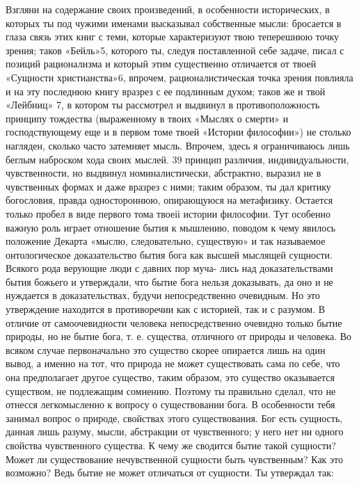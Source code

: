 \documentclass[12pt]{article}
\begin{document}
Взгляни на содержание своих произведений, в  
особенности исторических, в которых ты под чужими 
именами высказывал собственные мысли: бросается в 
глаза связь этих книг с теми, которые характеризуют 
твою теперешнюю точку зрения; таков «Бейль»5,  
которого ты, следуя поставленной себе задаче, писал с позиций рационализма и который этим существенно  
отличается от твоей «Сущности христианства»6, впрочем, рационалистическая точка зрения повлияла и на эту 
последнюю книгу вразрез с ее подлинным духом; таков 
же и твой «Лейбниц» 7, в котором ты рассмотрел и  
выдвинул в противоположность принципу тождества  
(выраженному в твоих «Мыслях о смерти» и  
господствующему еще и в первом томе твоей «Истории философии») 
не столько нагляден, сколько часто затемняет мысль.  
Впрочем, здесь я ограничиваюсь лишь беглым наброском хода 
своих мыслей. 
39 
принцип различия, индивидуальности, чувственности, 
но выдвинул номиналистически, абстрактно, выразил 
не в чувственных формах и даже вразрез с ними;  
таким образом, ты дал критику богословия, правда  
одностороннюю, опирающуюся на метафизику. Остается 
только пробел в виде первого тома твоеіі истории  
философии. Тут особенно важную роль играет отношение 
бытия к мышлению, поводом к чему явилось положение 
Декарта «мыслю, следовательно, существую» и так  
называемое онтологическое доказательство бытия бога 
как высшей мыслящей сущности. 
Всякого рода верующие люди с давних пор муча- 
лись над доказательствами бытия божьего и  
утверждали, что бытие бога нельзя доказывать, да оно и не 
нуждается в доказательствах, будучи непосредственно 
очевидным. Но это утверждение находится в  
противоречии как с историей, так и с разумом. В отличие от 
самоочевидности человека непосредственно очевидно 
только бытие природы, но не бытие бога, т. е.  
существа, отличного от природы и человека. Во всяком  
случае первоначально это существо скорее опирается лишь 
на один вывод, а именно на тот, что природа не может 
существовать сама по себе, что она предполагает  
другое существо, таким образом, это существо оказывается 
существом, не подлежащим сомнению. Поэтому ты  
правильно сделал, что не отнесся легкомысленно к вопросу 
о существовании бога. В особенности тебя занимал  
вопрос о природе, свойствах этого существования. Бог есть 
сущность, данная лишь разуму, мысли, абстракции от 
чувственного; у него нет ни одного свойства  
чувственного существа. К чему же сводится бытие такой  
сущности? Может ли существование нечувственной  
сущности быть чувственным? Как это возможно? Ведь бытие 
не может отличаться от сущности. Ты утверждал так: 
\end{document}

